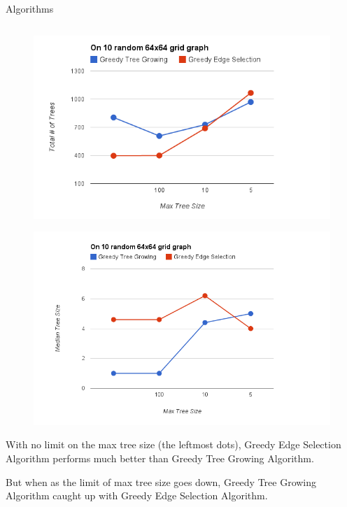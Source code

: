 \documentclass[serif,mathserif,final]{beamer}
\begin{document}
\begin{frame}{}
\begin{columns}[t]
\begin{column}{0.49\linewidth}
\begin{block}{\Huge Algorithms}
\begin{columns}[t]
\begin{column}{0.49\linewidth}
\begin{figure}
	\centering
	\includegraphics[width=\columnwidth]{TotalTrees-Vs-MaxTreeSize.png}
\end{figure}
\vspace{-0.4in}
\begin{figure}
	\centering
	\includegraphics[width=\columnwidth]{MedianTreeSize-Vs-MaxTreeSize.png}
\end{figure}
\vspace{-0.4in}

			
				{\huge
					With no limit on the max tree size (the leftmost
					dots), Greedy Edge Selection Algorithm performs
					much better than Greedy Tree Growing Algorithm. 

					But when as the limit of max tree size goes down,
					Greedy Tree Growing Algorithm caught up with
					Greedy Edge Selection Algorithm.
				}
			\end{column}
		\end{columns}


\end{block}
\end{column}
\end{columns}
\end{frame}
\end{document}
